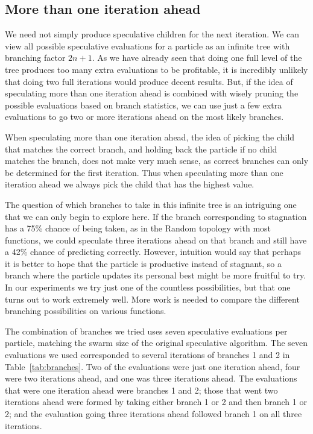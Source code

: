 \documentclass[journal,letterpaper]{IEEEtran}
\begin{document}
\subsection{More than one iteration ahead}
\label{sec:manyiters}

We need not simply produce speculative children for the next iteration.  We can
view all possible speculative evaluations for a particle as an infinite tree
with branching factor $2n+1$.  As we have already seen that doing one full
level of the tree produces too many extra evaluations to be profitable, it is
incredibly unlikely that doing two full iterations would produce decent
results.  But, if the idea of speculating more than one iteration ahead is
combined with wisely pruning the possible evaluations based on branch
statistics, we can use just a few extra evaluations to go two or more
iterations ahead on the most likely branches.

When speculating more than one iteration ahead, the idea of picking the child
that matches the correct branch, and holding back the particle if no child
matches the branch, does not make very much sense, as correct branches can only
be determined for the first iteration.  Thus when speculating more than one
iteration ahead we always pick the child that has the highest value.

The question of which branches to take in this infinite tree is an intriguing
one that we can only begin to explore here.  If the branch corresponding to
stagnation has a 75\% chance of being taken, as in the Random topology with
most functions, we could speculate three iterations ahead on that branch and
still have a 42\% chance of predicting correctly.  However, intuition would say
that perhaps it is better to hope that the particle is productive instead of
stagnant, so a branch where the particle updates its personal best might be
more fruitful to try.  In our experiments we try just one of the countless
possibilities, but that one turns out to work extremely well.  More work is
needed to compare the different branching possibilities on various functions.

The combination of branches we tried uses seven speculative evaluations per
particle, matching the swarm size of the original speculative algorithm.  The
seven evaluations we used corresponded to several iterations of branches 1 and
2 in Table~\ref{tab:branches}.  Two of the evaluations were just one iteration
ahead, four were two iterations ahead, and one was three iterations ahead.  The
evaluations that were one iteration ahead were branches 1 and 2; those that
went two iterations ahead were formed by taking either branch 1 or 2 and then
branch 1 or 2; and the evaluation going three iterations ahead followed branch
1 on all three iterations.
\end{document}
